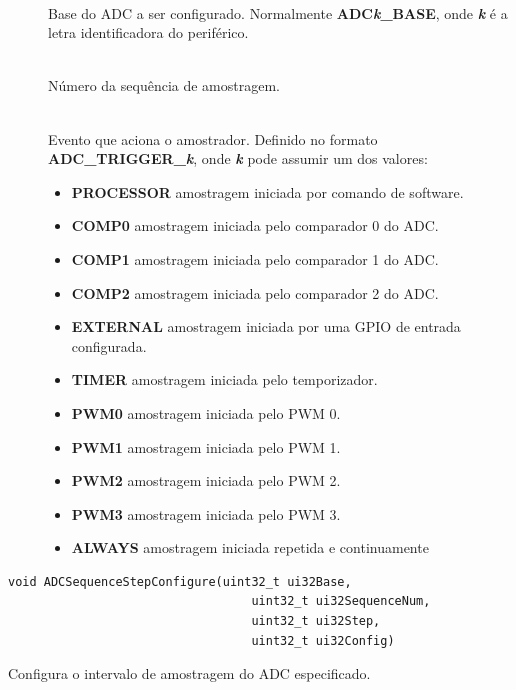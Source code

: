 \begin{description}
	\item []\hfill \\
	Base do ADC a ser configurado. Normalmente \textbf{ADC\emph{k}\_BASE}, onde \textbf{\emph{k}} é a letra identificadora do periférico.
	
	\item []\hfill \\
	Número da sequência de amostragem.
	
	\item []\hfill \\
	Evento que aciona o amostrador. Definido no formato \textbf{ADC\_TRIGGER\_\emph{k}}, onde \textbf{\emph{k}} pode assumir um dos valores:
	\begin{itemize}
		\item \textbf{PROCESSOR} amostragem iniciada por comando de software.
		\item \textbf{COMP0} amostragem iniciada pelo comparador 0 do ADC.
		\item \textbf{COMP1} amostragem iniciada pelo comparador 1 do ADC.
		\item \textbf{COMP2} amostragem iniciada pelo comparador 2 do ADC.
		\item \textbf{EXTERNAL} amostragem iniciada por uma GPIO de entrada configurada.
		\item \textbf{TIMER} amostragem iniciada pelo temporizador.
		\item \textbf{PWM0} amostragem iniciada pelo PWM 0.
		\item \textbf{PWM1} amostragem iniciada pelo PWM 1.
		\item \textbf{PWM2} amostragem iniciada pelo PWM 2.
		\item \textbf{PWM3} amostragem iniciada pelo PWM 3.
		\item \textbf{ALWAYS} amostragem iniciada repetida e continuamente
	\end{itemize}
\end{description}

\begin{lstlisting}[style=funcao]
	void ADCSequenceStepConfigure(uint32_t ui32Base,
								  uint32_t ui32SequenceNum,
								  uint32_t ui32Step,
								  uint32_t ui32Config)
\end{lstlisting}

Configura o intervalo de amostragem do ADC especificado.

